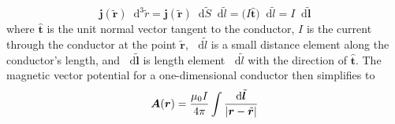 \documentclass[11pt, a4paper]{article}
\newcommand{\diff}{\mathop{}\!\mathrm{d}} %
\renewcommand{\vec}[1]{\bm{#1}} %
\newcommand{\uvec}[1]{\hat{\vec{#1}}} %
\newcommand{\tvec}[1]{\tilde{\vec{#1}}} %
\renewcommand{\r}{\vec{r}}
\newcommand{\A}{\vec{A}} %
\begin{document}
\begin{itemize}
	\begin{equation*}
		\vec{j}(\tvec{r})\diff^{3}\tilde{r} = \vec{j}(\tvec{r}) \diff \tilde{S} \diff \tilde{l} = \big(I \uvec{t}\big) \diff \tilde{l} = I \diff \tvec{l}
	\end{equation*}
	where $ \uvec{t} $ is the unit normal vector tangent to the conductor, $ I $ is the current through the conductor at the point $ \tvec{r} $, $ \diff \tilde{l} $ is a small distance element along the conductor's length, and $ \diff \tvec{l} $ is length element $ \diff \tilde{l} $ with the direction of $ \uvec{t} $. The magnetic vector potential for a one-dimensional conductor then simplifies to
	\begin{equation*}
		\A(\r) = \frac{\mu_{0}I}{4\pi} \int \frac{\diff \tvec{l}}{\abs{\r - \tvec{r}}}
	\end{equation*}
\end{itemize}
\end{document}
